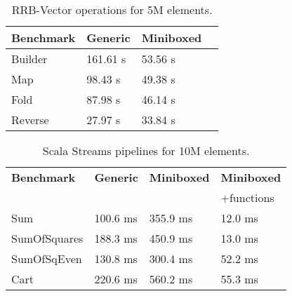 

\begin{table}[t]
  \centering
  \begin{tabularx}{0.48\textwidth}{|g *{3}{|Y}|} \hline
    \textbf{Benchmark} & \textbf{Generic}      & \textbf{Miniboxed} \\  \hline
    Builder            &        161.61 s       &           53.56 s  \\
    Map                &         98.43 s       &           49.38 s  \\
    Fold               &         87.98 s       &           46.14 s  \\
    Reverse            &         27.97 s       &           33.84 s  \\  \hline
  \end{tabularx}
  \vspace{-2mm}
  \caption{RRB-Vector operations for 5M elements.}
  \label{table:pureimage}
  \vspace{-1em}
\end{table}


\begin{table}[t]
  \begin{tabularx}{0.48\textwidth}{|g *{3}{|Y}|} \hline
    \textbf{Benchmark} & \textbf{Generic} & \textbf{Miniboxed}& \textbf{Miniboxed} \\
                       &                  &                   & +functions \\ \hline
    Sum              &              100.6 ms &              355.9 ms &             12.0 ms \\
    SumOfSquares     &              188.3 ms &              450.9 ms &             13.0 ms \\
    SumOfSqEven      &              130.8 ms &              300.4 ms &             52.2 ms \\
    Cart             &              220.6 ms &              560.2 ms &             55.3 ms \\ \hline
  \end{tabularx}
  \vspace{-2mm}
  \caption{Scala Streams pipelines for 10M elements.}
  \label{table:streams}
  \vspace{-1em}
\end{table}

